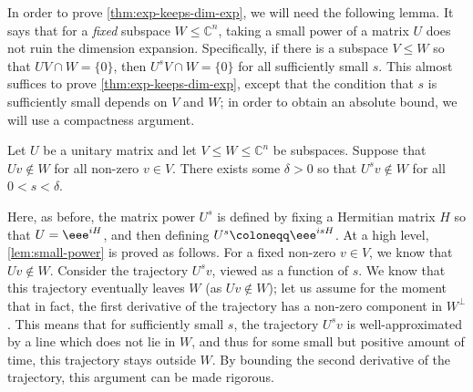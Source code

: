 \documentclass{toc}
\theoremstyle{plain}
\numberwithin{equation}{section}
\theoremstyle{definition}
\newcommand{\bC}{\mathbb{C}}
\begin{document}
In order to prove \cref{thm:exp-keeps-dim-exp}, we will need the following lemma. It says that for a \emph{fixed} subspace $W \leq \bC^n$, taking a small power of a matrix $U$ does not 
%
ruin the dimension expansion. 
%
%
Specifically, %
if there is a subspace $V \leq W$ so that $UV \cap W = \{0\}$, then $U^s V \cap W=\{0\}$ for all sufficiently small $s$. This almost suffices to prove \cref{thm:exp-keeps-dim-exp}, except that the 
%
%
%
condition that $s$ is sufficiently small %
%
depends on $V$ and $W$; in order to obtain an absolute bound,
%
%
%
we will use a compactness argument.
\begin{lemma}\label{lem:small-power}
    Let $U$ be a unitary matrix and let $V \leq W \leq \bC^n$ be subspaces. Suppose that $Uv \notin W$ for all non-zero $v \in V$. There exists some $\delta>0$ so that $U^s v \notin W$ for all $0<s<\delta$.
\end{lemma}
Here, as before, the matrix power $U^s$ is defined by fixing a Hermitian matrix $H$ so that $U=\eee^{iH}$, and then defining %
%
$U^s \coloneqq \eee^{isH}$.  %
At a high level, \cref{lem:small-power} is proved as follows. For a fixed non-zero $v \in V$, we know that $Uv \notin W$. Consider the 
%
trajectory
%
$U^s v$, viewed as a function of $s$. We know that this trajectory eventually leaves $W$ (as $Uv \notin W$); let us assume for the moment that in fact, the first derivative of the trajectory has a non-zero component in $W^\perp$. This means that for sufficiently small $s$, the trajectory $U^s v$ is well-approximated by a line which does not lie in $W$, and thus for some small but positive amount of time, this trajectory stays outside $W$. By bounding the second derivative of the trajectory, this argument can be made rigorous. 
\end{document}
